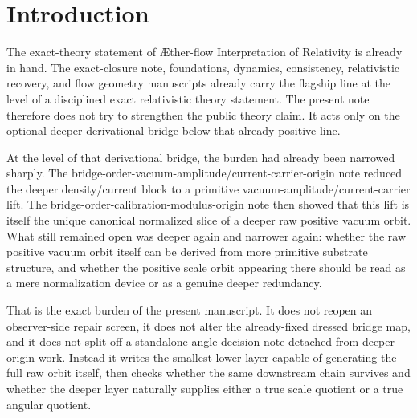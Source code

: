 \documentclass[11pt]{article}
\newcommand{\Aflow}{\AE{}ther-flow}
\newcommand{\TheoryName}{\Aflow{} Interpretation of Relativity}
\newcommand{\CurvProfileCan}{F_{\mathrm{br}}^{\mathrm{can}}}
\newcommand{\RespRawRef}{\widehat U_{\mathrm{br}}^{\mathrm{ref}}}
\newcommand{\RespRawEq}{\widehat U_{\mathrm{br}}^{\ast}}
\newcommand{\RespShapeEq}{\widetilde U_{\mathrm{br}}^{\ast}}
\begin{document}
\begin{abstract}
The same downstream chain survives unchanged. The same density/current block, the same composite primitive bridge-order block, the same phase-neutral minimizing branch, the same canonical profile
\[
\CurvProfileCan(x)=1+\RespShapeEq\,x^2
=1+\frac{\RespRawEq}{\RespRawRef}x^2,
\]
and the same surviving dressed bridge map are recovered exactly. At the same time the deeper verdict is disciplined rather than inflated. The positive scale orbit is now derived, but it is not promoted to a genuine deeper substrate redundancy: the present orbit-modulus sector supplies no quotient identifying different constant \(s\). The earlier canonical normalization remains the disciplined representative choice. Likewise the global \(O(2)\) vacuum angle remains residual because this deeper layer supplies neither angular locking nor an angle quotient.
\end{abstract}

\section{Introduction}

The exact-theory statement of \TheoryName{} is already in hand. The exact-closure note, foundations, dynamics, consistency, relativistic recovery, and flow geometry manuscripts already carry the flagship line at the level of a disciplined exact relativistic theory statement. The present note therefore does not try to strengthen the public theory claim. It acts only on the optional deeper derivational bridge below that already-positive line.

At the level of that derivational bridge, the burden had already been narrowed sharply. The bridge-order-vacuum-amplitude/current-carrier-origin note reduced the deeper density/current block to a primitive vacuum-amplitude/current-carrier lift. The bridge-order-calibration-modulus-origin note then showed that this lift is itself the unique canonical normalized slice of a deeper raw positive vacuum orbit. What still remained open was deeper again and narrower again: whether the raw positive vacuum orbit itself can be derived from more primitive substrate structure, and whether the positive scale orbit appearing there should be read as a mere normalization device or as a genuine deeper redundancy.

That is the exact burden of the present manuscript. It does not reopen an observer-side repair screen, it does not alter the already-fixed dressed bridge map, and it does not split off a standalone angle-decision note detached from deeper origin work. Instead it writes the smallest lower layer capable of generating the full raw orbit itself, then checks whether the same downstream chain survives and whether the deeper layer naturally supplies either a true scale quotient or a true angular quotient.
\end{document}
